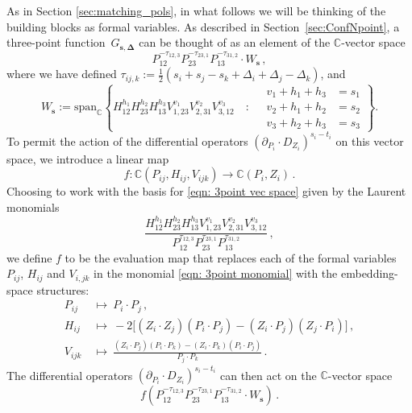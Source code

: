 \documentclass[12pt,a4paper]{extarticle}
\theoremstyle{definition}
\begin{document}
As in Section \ref{sec:matching_pols}, in what follows we will be thinking of the building blocks as formal variables. As described in Section~\ref{sec:ConfNpoint}, a three-point function~$G_{\mathbf{s},\mathbf{\Delta}}$ can be thought of as an element of the $\mathbb{C}$-vector space
\begin{equation}\label{eqn: 3point vec space}
    P^{-\tau_{12,3}}_{12}P^{-\tau_{23,1}}_{23}P^{-\tau_{31,2}}_{13}\cdot W_{\mathbf{s}}\,,
\end{equation}
where we have defined $\tau_{ij,k}:=\frac{1}{2}(s_i+s_j-s_k + \Delta_i + \Delta_j -\Delta_k)$, and
\begin{equation}
        W_{\mathbf{s}}:=\mathrm{span}_{\mathbb{C}}\left\{H^{h_{1}}_{12}H^{h_{2}}_{23}H^{h_{3}}_{13}V^{v_1}_{1,23}V^{v_2}_{2,31}V^{v_3}_{3,12}\quad:\quad \begin{aligned} v_1+h_1+h_3&=s_1\\v_2+h_1+h_2&=s_2\\v_3+h_2+h_3&=s_3\end{aligned}\right\}.
\end{equation}
To permit the action of the differential operators $(\partial_{P_i}\cdot D_{Z_i})^{s_i-t_i}$ on this vector space, we introduce a linear map
\begin{equation}
    f:\mathbb{C}(P_{ij},H_{ij},V_{ijk})\rightarrow\mathbb{C}(P_i,Z_i)\,.
\end{equation}
Choosing to work with the basis for \eqref{eqn: 3point vec space} given by the Laurent monomials
\begin{equation}\label{eqn: 3point monomial}
\frac{H^{h_{1}}_{12}H^{h_{2}}_{23}H^{h_{3}}_{13}V^{v_1}_{1,23}V^{v_2}_{2,31}V^{v_3}_{3,12}}{P^{\tau_{12,3}}_{12}P^{\tau_{23,1}}_{23}P^{\tau_{31,2}}_{13}}\,,
\end{equation}
we define $f$ to be the evaluation map that replaces each of the formal variables $P_{ij}$, $H_{ij}$ and $V_{i,jk}$ in the monomial \eqref{eqn: 3point monomial} with the embedding-space structures:
\begin{align}
      P_{ij}
  & \ \mapsto  \ P_i\cdot P_j\,,\\
  H_{ij}
  & \ \mapsto \ -2\bigl[(Z_i\cdot Z_j)(P_i\cdot P_j)
             -(Z_i\cdot P_j)(Z_j\cdot P_i)\bigr]\,,\\
  V_{ijk}
  & \ \mapsto \ \frac{(Z_i\cdot P_j)(P_i\cdot P_k)
           -(Z_i\cdot P_k)(P_i\cdot P_j)}
          {P_j\cdot P_k}\,.
\end{align}
The differential operators $(\partial_{P_i}\cdot D_{Z_i})^{s_i-t_i}$ can then act on the $\mathbb{C}$-vector space
\begin{equation}
    f(P^{-\tau_{12,3}}_{12}P^{-\tau_{23,1}}_{23}P^{-\tau_{31,2}}_{13}\cdot W_{\mathbf{s}})\,.
\end{equation}
\end{document}
